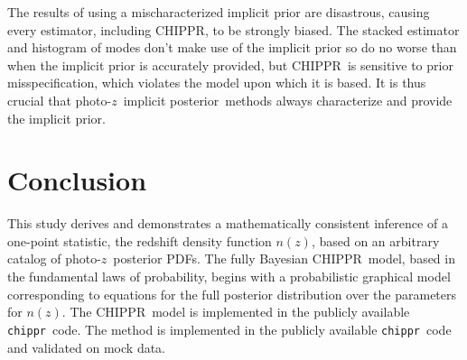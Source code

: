 \documentclass[iop]{emulateapj}
\newcommand{\todo}[3]{{\color{#2}\emph{#1}: #3}}
\newcommand{\que}[1]{\todo{Question}{cyan}{#1}}
\newcommand{\Sect}[1]{Section~\ref{#1}}
\newcommand{\Tab}[1]{Table~\ref{#1}}
\newcommand{\project}[1]{\textsc{#1}}
\newcommand{\Chippr}{\project{CHIPPR}}%
\newcommand{\repo}[1]{\texttt{#1}}
\newcommand{\chippr}{\repo{chippr}}
\newcommand{\pz}{photo-$z$}
\newcommand{\pzpdf}{\pz\ posterior PDF}%
\newcommand{\pzip}{\pz\ implicit posterior}
\newcommand{\nz}{$n(z)$}
\begin{document}
The results of using a mischaracterized implicit prior are disastrous, causing every estimator, including \Chippr, to be strongly biased.
The stacked estimator and histogram of modes don't make use of the implicit prior so do no worse than when the implicit prior is accurately provided, but \Chippr\ is sensitive to prior misspecification, which violates the model upon which it is based.
It is thus crucial that \pzip\ methods always characterize and provide the implicit prior.


\section{Conclusion}
\label{sec:con}


This study derives and demonstrates a mathematically consistent inference of a one-point statistic, the redshift density function \nz, based on an arbitrary catalog of \pzpdf s.
The fully Bayesian \Chippr\ model, based in the fundamental laws of probability, begins with a probabilistic graphical model corresponding to equations for the full posterior distribution over the parameters for \nz.
The \Chippr\ model is implemented in the publicly available \chippr\ code.
The method is implemented in the publicly available \chippr\ code and validated on mock data.

\end{document}
